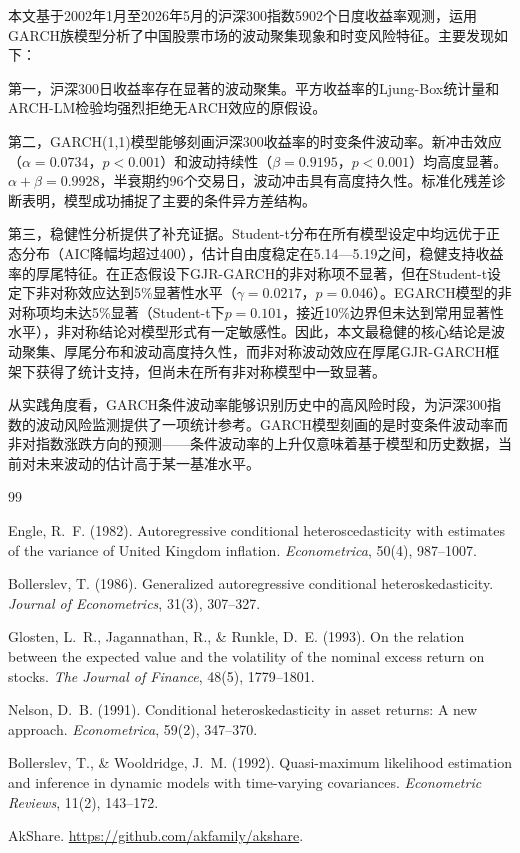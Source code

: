 \documentclass[11pt,a4paper]{article}
\begin{document}
本文基于2002年1月至2026年5月的沪深300指数5902个日度收益率观测，运用GARCH族模型分析了中国股票市场的波动聚集现象和时变风险特征。主要发现如下：

第一，沪深300日收益率存在显著的波动聚集。平方收益率的Ljung-Box统计量和ARCH-LM检验均强烈拒绝无ARCH效应的原假设。

第二，GARCH(1,1)模型能够刻画沪深300收益率的时变条件波动率。新冲击效应（\(\alpha=0.0734\)，\(p<0.001\)）和波动持续性（\(\beta=0.9195\)，\(p<0.001\)）均高度显著。\(\alpha+\beta=0.9928\)，半衰期约96个交易日，波动冲击具有高度持久性。标准化残差诊断表明，模型成功捕捉了主要的条件异方差结构。

第三，稳健性分析提供了补充证据。Student-t分布在所有模型设定中均远优于正态分布（AIC降幅均超过400），估计自由度稳定在5.14—5.19之间，稳健支持收益率的厚尾特征。在正态假设下GJR-GARCH的非对称项不显著，但在Student-t设定下非对称效应达到5\%显著性水平（\(\gamma=0.0217\)，\(p=0.046\)）。EGARCH模型的非对称项均未达5\%显著（Student-t下\(p=0.101\)，接近10\%边界但未达到常用显著性水平），非对称结论对模型形式有一定敏感性。因此，本文最稳健的核心结论是波动聚集、厚尾分布和波动高度持久性，而非对称波动效应在厚尾GJR-GARCH框架下获得了统计支持，但尚未在所有非对称模型中一致显著。

从实践角度看，GARCH条件波动率能够识别历史中的高风险时段，为沪深300指数的波动风险监测提供了一项统计参考。GARCH模型刻画的是时变条件波动率而非对指数涨跌方向的预测——条件波动率的上升仅意味着基于模型和历史数据，当前对未来波动的估计高于某一基准水平。

\begin{thebibliography}{99}

Engle, R.~F. (1982).
Autoregressive conditional heteroscedasticity with estimates of the variance of United Kingdom inflation.
\textit{Econometrica}, 50(4), 987--1007.

Bollerslev, T. (1986).
Generalized autoregressive conditional heteroskedasticity.
\textit{Journal of Econometrics}, 31(3), 307--327.

Glosten, L.~R., Jagannathan, R., \& Runkle, D.~E. (1993).
On the relation between the expected value and the volatility of the nominal excess return on stocks.
\textit{The Journal of Finance}, 48(5), 1779--1801.

Nelson, D.~B. (1991).
Conditional heteroskedasticity in asset returns: A new approach.
\textit{Econometrica}, 59(2), 347--370.

Bollerslev, T., \& Wooldridge, J.~M. (1992).
Quasi-maximum likelihood estimation and inference in dynamic models with time-varying covariances.
\textit{Econometric Reviews}, 11(2), 143--172.

AkShare. \url{https://github.com/akfamily/akshare}.

\end{thebibliography}
\end{document}

